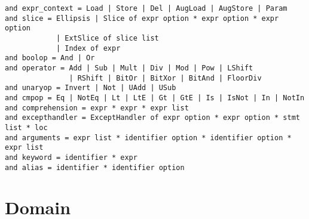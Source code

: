 \documentclass[10pt]{article}
\begin{document}
\begin{verbatim}
and expr_context = Load | Store | Del | AugLoad | AugStore | Param
and slice = Ellipsis | Slice of expr option * expr option * expr option
            | ExtSlice of slice list
            | Index of expr
and boolop = And | Or 
and operator = Add | Sub | Mult | Div | Mod | Pow | LShift 
               | RShift | BitOr | BitXor | BitAnd | FloorDiv
and unaryop = Invert | Not | UAdd | USub
and cmpop = Eq | NotEq | Lt | LtE | Gt | GtE | Is | IsNot | In | NotIn
and comprehension = expr * expr * expr list
and excepthandler = ExceptHandler of expr option * expr option * stmt list * loc
and arguments = expr list * identifier option * identifier option * expr list
and keyword = identifier * expr
and alias = identifier * identifier option
\end{verbatim}

\section{Domain}
\end{document}
